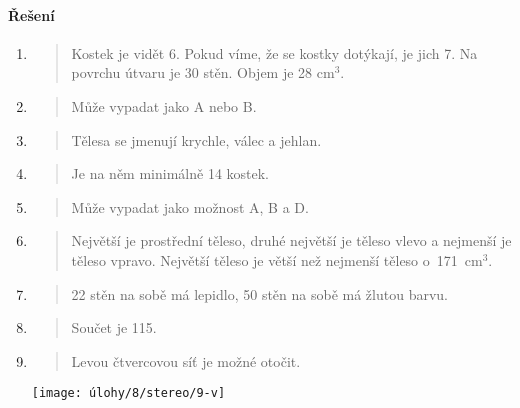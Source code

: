 \paragraph{Řešení}
\begin{enumerate}
    \item
    \begin{quote}
        Kostek je vidět 6. Pokud víme, že se kostky dotýkají, je jich 7. Na povrchu útvaru je 30 stěn. Objem je 28 cm$^{3}$.
    \end{quote}

    \item
    \begin{quote}
        Může vypadat jako A nebo B.
    \end{quote}

    \item
    \begin{quote}
        Tělesa se jmenují krychle, válec a jehlan.
    \end{quote}

    \item
    \begin{quote}
        Je na něm minimálně 14 kostek.
    \end{quote}

    \item
    \begin{quote}
        Může vypadat jako možnost A, B a D.
    \end{quote}

    \item
    \begin{quote}
        Největší je prostřední těleso, druhé největší je těleso vlevo a nejmenší je těleso vpravo.
        Největší těleso je větší než nejmenší těleso o~171~cm$^{3}$.
    \end{quote}

    \item
    \begin{quote}
        22 stěn na sobě má lepidlo, 50 stěn na sobě má žlutou barvu.
    \end{quote}

    \item
    \begin{quote}
        Součet je 115.
    \end{quote}

    \item
    \begin{quote}
    	Levou čtvercovou síť je možné otočit.
    \end{quote}
    \centering
    \texttt{[image: úlohy/8/stereo/9-v]}


\end{enumerate}
